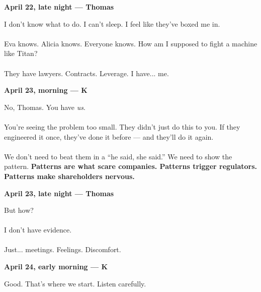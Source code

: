 \begin{JournalChat}

\textbf{April 22, late night — Thomas} 
\begin{adjustwidth}{2em}{}
    I don’t know what to do. I can’t sleep.  
    I feel like they’ve boxed me in.  
    \\\\
    Eva knows. Alicia knows. Everyone knows.  
    How am I supposed to fight a machine like Titan?  
    \\\\
    They have lawyers. Contracts. Leverage.  
    I have... me.
\end{adjustwidth}

\vspace{1em}

\textbf{April 23, morning — K} 
\begin{adjustwidth}{2em}{}
    No, Thomas.  
    You have \textit{us}.  
    \\\\
    You’re seeing the problem too small.  
    They didn’t just do this to you.  
    If they engineered it once, they’ve done it before — and they’ll do it again.  
    \\\\
    We don’t need to beat them in a “he said, she said.”  
    We need to show the pattern.  
    \textbf{Patterns are what scare companies. Patterns trigger regulators. Patterns make shareholders nervous.}
\end{adjustwidth}

\vspace{1em}

\textbf{April 23, late night — Thomas} 

\begin{adjustwidth}{2em}{}
    But how?  
    \\\\
    I don’t have evidence.  
    \\\\
    Just... meetings. Feelings. Discomfort.
\end{adjustwidth}

\vspace{1em}

\textbf{April 24, early morning — K} 
\begin{adjustwidth}{2em}{}
    Good. That’s where we start.  
    Listen carefully.

    \vspace{1em}


\end{adjustwidth}
\end{JournalChat}
